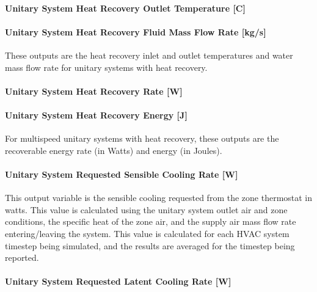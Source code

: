 \paragraph{Unitary System Heat Recovery Outlet Temperature {[}C{]}}\label{unitary-system-heat-recovery-outlet-temperature-c}

\paragraph{Unitary System Heat Recovery Fluid Mass Flow Rate {[}kg/s{]}}\label{unitary-system-heat-recovery-fluid-mass-flow-rate-kgs}

These outputs are the heat recovery inlet and outlet temperatures and water mass flow rate for unitary systems with heat recovery.

\paragraph{Unitary System Heat Recovery Rate {[}W{]}}\label{unitary-system-heat-recovery-rate-w}

\paragraph{Unitary System Heat Recovery Energy {[}J{]}}\label{unitary-system-heat-recovery-energy-j}

For multispeed unitary systems with heat recovery, these outputs are the recoverable energy rate (in Watts) and energy (in Joules).

\paragraph{Unitary System Requested Sensible Cooling Rate {[}W{]}}\label{unitary-system-requested-sensible-cooling-rate-w}

This output variable is the sensible cooling requested from the zone thermostat in watts. This value is calculated using the unitary system outlet air and zone conditions, the specific heat of the zone air, and the supply air mass flow rate entering/leaving the system. This value is calculated for each HVAC system timestep being simulated, and the results are averaged for the timestep being reported.

\paragraph{Unitary System Requested Latent Cooling Rate {[}W{]}}\label{unitary-system-requested-latent-cooling-rate-w}


